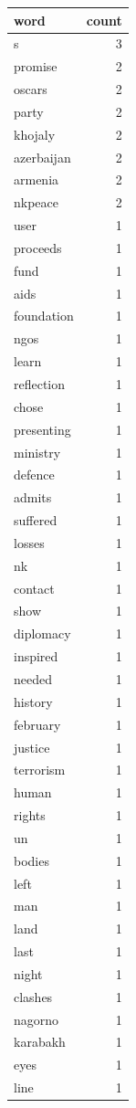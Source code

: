 \begin{tabular}{lr}
\toprule
word & count \\
\midrule
s & 3 \\
promise & 2 \\
oscars & 2 \\
party & 2 \\
khojaly & 2 \\
azerbaijan & 2 \\
armenia & 2 \\
nkpeace & 2 \\
user & 1 \\
proceeds & 1 \\
fund & 1 \\
aids & 1 \\
foundation & 1 \\
ngos & 1 \\
learn & 1 \\
reflection & 1 \\
chose & 1 \\
presenting & 1 \\
ministry & 1 \\
defence & 1 \\
admits & 1 \\
suffered & 1 \\
losses & 1 \\
nk & 1 \\
contact & 1 \\
show & 1 \\
diplomacy & 1 \\
inspired & 1 \\
needed & 1 \\
history & 1 \\
february & 1 \\
justice & 1 \\
terrorism & 1 \\
human & 1 \\
rights & 1 \\
un & 1 \\
bodies & 1 \\
left & 1 \\
man & 1 \\
land & 1 \\
last & 1 \\
night & 1 \\
clashes & 1 \\
nagorno & 1 \\
karabakh & 1 \\
eyes & 1 \\
line & 1 \\
\bottomrule
\end{tabular}

